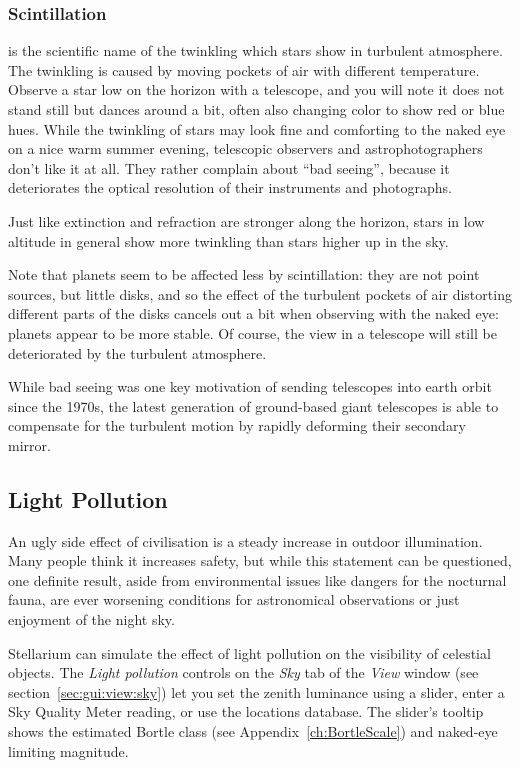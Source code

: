 \subsubsection{Scintillation}
\label{sec:phenomena:Scintillation}
 is the scientific name of the twinkling which stars show
in turbulent atmosphere. The twinkling is caused by moving pockets of air with different temperature. 
Observe a star low on the horizon with a telescope, and you will note it does not stand still 
but dances around a bit, often also changing color to show red or blue hues.
While the twinkling of stars may look fine and comforting to the naked eye on a nice warm summer evening, 
telescopic observers and astrophotographers don't like it at all. They rather complain about ``bad seeing'', 
because it deteriorates the optical resolution of their instruments and photographs. 

Just like extinction and refraction are stronger along the horizon, 
stars in low altitude in general show more twinkling than stars higher up in the sky. 

Note that planets seem to be affected less by scintillation: they are not point sources, but little disks, 
and so the effect of the turbulent pockets of air distorting different parts of the disks cancels out a bit 
when observing with the naked eye: planets appear to be more stable.
Of course, the view in a telescope will still be deteriorated by the turbulent atmosphere.

While bad seeing was one key motivation of sending telescopes into earth orbit since the 1970s, 
the latest generation of ground-based giant telescopes is able to compensate for the turbulent 
motion by rapidly deforming their secondary mirror. 



\subsection{Light Pollution}
\label{sec:phenomena:LightPollution}

An ugly side effect of civilisation is a steady increase in outdoor
illumination. Many people think it increases safety, but while this
statement can be questioned, one definite result, aside from
environmental issues like dangers for the nocturnal fauna, are ever
worsening conditions for astronomical observations or just enjoyment
of the night sky. 

Stellarium can simulate the effect of light pollution on the visibility
of celestial objects. The \emph{Light pollution} controls on the \emph{Sky}
tab of the \emph{View} window (see section~\ref{sec:gui:view:sky}) let you
set the zenith luminance using a slider, enter a Sky Quality Meter reading,
or use the locations database. The slider's tooltip shows the estimated
Bortle class (see Appendix~\ref{ch:BortleScale}) and naked-eye limiting magnitude.


